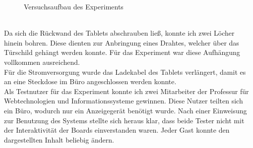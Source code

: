 \begin{figure}[h!]
  \centering
  \caption{Versuchsaufbau des Experiments}
  \label{img:Versuchsaufbau}
\end{figure}
\\
Da sich die Rückwand des Tablets abschrauben ließ, konnte ich zwei Löcher hinein bohren. Diese dienten zur Anbringung eines Drahtes, welcher über das Türschild gehängt werden konnte. Für das Experiment war diese Aufhängung vollkommen ausreichend.
\\
Für die Stromversorgung wurde das Ladekabel des Tablets verlängert, damit es an eine Steckdose im Büro angeschlossen werden konnte.
\\
Als Testnutzer für das Experiment konnte ich zwei Mitarbeiter der Professur für Webtechnologien und Informationssysteme gewinnen.
Diese Nutzer teilten sich ein Büro, wodurch nur ein Anzeigegerät benötigt wurde.
Nach einer Einweisung zur Benutzung des Systems stellte sich heraus klar, dass beide Tester nicht mit der Interaktivität der Boards einverstanden waren.
Jeder Gast konnte den dargestellten Inhalt beliebig ändern.
